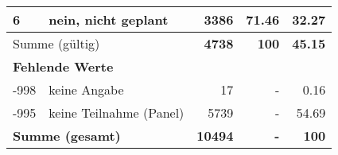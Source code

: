 \begin{longtable}{lXrrr}
     6 &
     \multicolumn{1}{X}{ nein, nicht geplant   } &


       \num{3386} &
       \num[round-mode=places,round-precision=2]{71.46} &
         \num[round-mode=places,round-precision=2]{32.27} \\
     \midrule
     \multicolumn{2}{l}{Summe (gültig)} &
       \textbf{\num{4738}} &
     \textbf{\num{100}} &
       \textbf{\num[round-mode=places,round-precision=2]{45.15}} \\
     \multicolumn{5}{l}{\textbf{Fehlende Werte}}\\
       -998 &
       keine Angabe &
         \num{17} &
        - &
         \num[round-mode=places,round-precision=2]{0.16} \\
       -995 &
       keine Teilnahme (Panel) &
         \num{5739} &
        - &
         \num[round-mode=places,round-precision=2]{54.69} \\
     \midrule
     \multicolumn{2}{l}{\textbf{Summe (gesamt)}} &
          \textbf{\num{10494}} &
        \textbf{-} &
        \textbf{\num{100}} \\
     \bottomrule
     \end{longtable}
     
